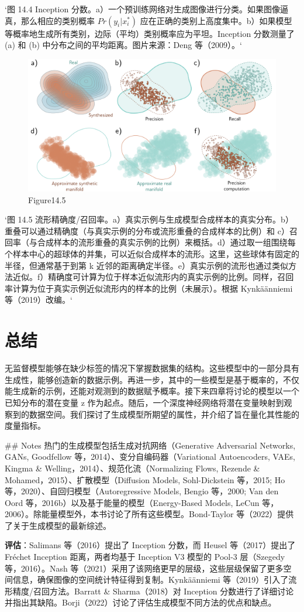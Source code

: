 `图 14.4 Inception 分数。a）一个预训练网络对生成图像进行分类。如果图像逼真，那么相应的类别概率 \(Pr(y_i | x^*_i)\) 应在正确的类别上高度集中。b）如果模型等概率地生成所有类别，边际（平均）类别概率应为平坦。Inception 分数测量了 (a) 和 (b) 中分布之间的平均距离。图片来源：Deng 等（2009）。`

\begin{figure}[h!]
\centering
\includegraphics[width=0.7\linewidth]{png/chapter14/UnsupPrecisionRecall.png}
\caption{Figure14.5}
\end{figure}

`图 14.5 流形精确度/召回率。a）真实示例与生成模型合成样本的真实分布。b）重叠可以通过精确度（与真实示例的分布或流形重叠的合成样本的比例）和 c）召回率（与合成样本的流形重叠的真实示例的比例）来概括。d）通过取一组围绕每个样本中心的超球体的并集，可以近似合成样本的流形。这里，这些球体有固定的半径，但通常基于到第 k 近邻的距离确定半径。e）真实示例的流形也通过类似方法近似。f）精确度可计算为位于样本近似流形内的真实示例的比例。同样，召回率计算为位于真实示例近似流形内的样本的比例（未展示）。根据 Kynkäänniemi 等（2019）改编。`
\section{总结}
无监督模型能够在缺少标签的情况下掌握数据集的结构。这些模型中的一部分具有生成性，能够创造新的数据示例。再进一步，其中的一些模型是基于概率的，不仅能生成新的示例，还能对观测到的数据赋予概率。接下来四章将讨论的模型以一个已知分布的潜在变量 z 作为起点。随后，一个深度神经网络将潜在变量映射到观察到的数据空间。我们探讨了生成模型所期望的属性，并介绍了旨在量化其性能的度量指标。

## Notes
热门的生成模型包括生成对抗网络（Generative Adversarial Networks, GANs, Goodfellow 等，2014）、变分自编码器（Variational Autoencoders, VAEs, Kingma & Welling，2014）、规范化流（Normalizing Flows, Rezende & Mohamed，2015）、扩散模型（Diffusion Models, Sohl-Dickstein 等，2015; Ho 等，2020）、自回归模型（Autoregressive Models, Bengio 等，2000; Van den Oord 等，2016b）以及基于能量的模型（Energy-Based Models, LeCun 等，2006）。除能量模型外，本书讨论了所有这些模型。Bond-Taylor 等（2022）提供了关于生成模型的最新综述。

\textbf{评估}：Salimans 等（2016）提出了 Inception 分数，而 Heusel 等（2017）提出了 Fréchet Inception 距离，两者均基于 Inception V3 模型的 Pool-3 层（Szegedy 等，2016）。Nash 等（2021）采用了该网络更早的层级，这些层级保留了更多空间信息，确保图像的空间统计特征得到复制。Kynkäänniemi 等（2019）引入了流形精度/召回方法。Barratt & Sharma（2018）对 Inception 分数进行了详细讨论并指出其缺陷。Borji（2022）讨论了评估生成模型不同方法的优点和缺点。
